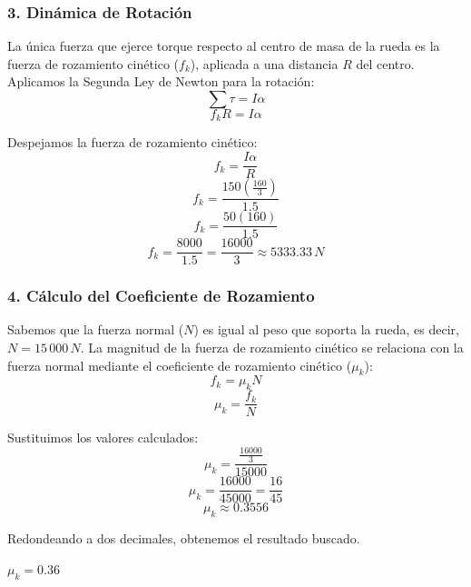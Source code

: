\documentclass[12pt, a4paper]{article}
\begin{document}
\subsubsection*{3. Dinámica de Rotación}
La única fuerza que ejerce torque respecto al centro de masa de la rueda es la fuerza de rozamiento cinético ($f_k$), aplicada a una distancia $R$ del centro.
Aplicamos la Segunda Ley de Newton para la rotación:
$$\sum \tau = I \alpha$$
$$f_k R = I \alpha$$

Despejamos la fuerza de rozamiento cinético:
$$f_k = \frac{I \alpha}{R}$$
$$f_k = \frac{150 \left(\frac{160}{3}\right)}{1.5}$$
$$f_k = \frac{50 (160)}{1.5}$$
$$f_k = \frac{8000}{1.5} = \frac{16000}{3} \approx 5333.33 \, \si{N}$$

\subsubsection*{4. Cálculo del Coeficiente de Rozamiento}
Sabemos que la fuerza normal ($N$) es igual al peso que soporta la rueda, es decir, $N = 15\,000 \, \si{N}$.
La magnitud de la fuerza de rozamiento cinético se relaciona con la fuerza normal mediante el coeficiente de rozamiento cinético ($\mu_k$):
$$f_k = \mu_k N$$
$$\mu_k = \frac{f_k}{N}$$

Sustituimos los valores calculados:
$$\mu_k = \frac{\frac{16000}{3}}{15000}$$
$$\mu_k = \frac{16000}{45000} = \frac{16}{45}$$
$$\mu_k \approx 0.3556$$

Redondeando a dos decimales, obtenemos el resultado buscado.

\begin{tcolorbox}[colback=green!5!white, colframe=green!50!black, title=Respuesta Final]
\centering \Large $\mu_k = 0.36$
\end{tcolorbox}
\end{document}
